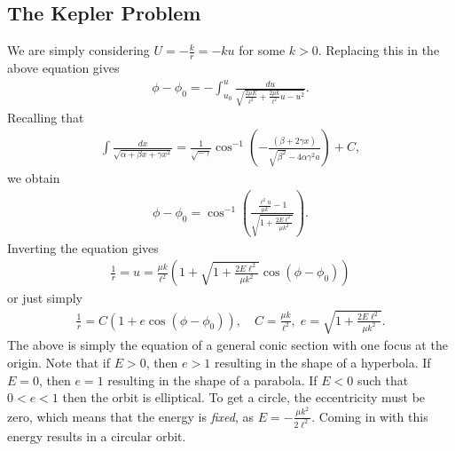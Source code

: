 \subsection{The Kepler Problem}
We are simply considering $U = -\frac{k}{r} = -ku$ for some $k > 0$. Replacing this in the above equation gives
\begin{align}
    \phi - \phi_{0} = -\int_{u_{0}}^{u} \frac{du}{\sqrt{\frac{2\mu E}{\ell^{2}} + \frac{2\mu k}{\ell^{2}}u - u^{2}}}.
\end{align}
Recalling that
\begin{align}
    \int \frac{dx}{\sqrt{\alpha + \beta x + \gamma x^{2}}} = \frac{1}{\sqrt{-\gamma}} \cos^{-1} \left( -\frac{(\beta + 2\gamma x)}{\sqrt{\beta^{2}} - 4\alpha \gamma^{2}a} \right) + C,
\end{align}
we obtain
\begin{align}
    \phi - \phi_{0} = \cos^{-1}\left( \frac{\frac{\ell^{2} u}{\mu k} - 1}{\sqrt{1 + \frac{2 E \ell^{2}}{\mu k^{2}}}} \right).
\end{align}
Inverting the equation gives
\begin{align}
    \frac{1}{r} = u = \frac{\mu k}{\ell^{2}} \left( 1 + \sqrt{1 + \frac{2E \ell^{2}}{\mu k^{2}}} \cos(\phi - \phi_{0}) \right)
\end{align}
or just simply
\begin{align}
    \frac{1}{r} = C\left( 1 + e \cos(\phi - \phi_{0}) \right),\quad C = \frac{\mu k}{\ell^{2}},\; e = \sqrt{1 + \frac{2E \ell^{2}}{\mu k^{2}}}.
\end{align}
The above is simply the equation of a general conic section with one focus at the origin. Note that if $E > 0$, then $e > 1$ resulting in the shape of a hyperbola. If $E = 0$, then $e = 1$ resulting in the shape of a parabola. If $E < 0$ such that $0 < e < 1$ then the orbit is elliptical. To get a circle, the eccentricity must be zero, which means that the energy is \textit{fixed}, as $E = -\frac{\mu k^{2}}{2\ell^{2}}$. Coming in with this energy results in a circular orbit. 